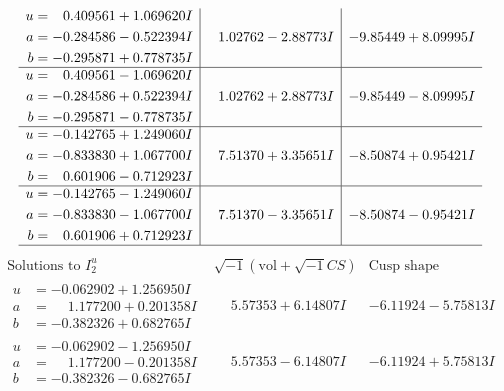 \documentclass[1p]{elsarticle_modified}
\theoremstyle{definition}
\newcommand{\I}{\sqrt{-1}}
\begin{document}
$$\begin{array}{c|c|c}
\begin{aligned}
u &= \phantom{-}0.409561 + 1.069620 I \\
a &= -0.284586 - 0.522394 I \\
b &= -0.295871 + 0.778735 I\end{aligned}
 & \phantom{-}1.02762 - 2.88773 I & -9.85449 + 8.09995 I \\ \hline\begin{aligned}
u &= \phantom{-}0.409561 - 1.069620 I \\
a &= -0.284586 + 0.522394 I \\
b &= -0.295871 - 0.778735 I\end{aligned}
 & \phantom{-}1.02762 + 2.88773 I & -9.85449 - 8.09995 I \\ \hline\begin{aligned}
u &= -0.142765 + 1.249060 I \\
a &= -0.833830 + 1.067700 I \\
b &= \phantom{-}0.601906 - 0.712923 I\end{aligned}
 & \phantom{-}7.51370 + 3.35651 I & -8.50874 + 0.95421 I \\ \hline\begin{aligned}
u &= -0.142765 - 1.249060 I \\
a &= -0.833830 - 1.067700 I \\
b &= \phantom{-}0.601906 + 0.712923 I\end{aligned}
 & \phantom{-}7.51370 - 3.35651 I & -8.50874 - 0.95421 I\\
 \hline 
 \end{array}$$\newpage$$\begin{array}{c|c|c}  
\text{Solutions to }I^u_{2}& \I (\text{vol} + \sqrt{-1}CS) & \text{Cusp shape}\\
 \hline 
\begin{aligned}
u &= -0.062902 + 1.256950 I \\
a &= \phantom{-}1.177200 + 0.201358 I \\
b &= -0.382326 + 0.682765 I\end{aligned}
 & \phantom{-}5.57353 + 6.14807 I & -6.11924 - 5.75813 I \\ \hline\begin{aligned}
u &= -0.062902 - 1.256950 I \\
a &= \phantom{-}1.177200 - 0.201358 I \\
b &= -0.382326 - 0.682765 I\end{aligned}
 & \phantom{-}5.57353 - 6.14807 I & -6.11924 + 5.75813 I \\ \hline\begin{aligned}

\end{aligned}
\end{array}$$
\end{document}
